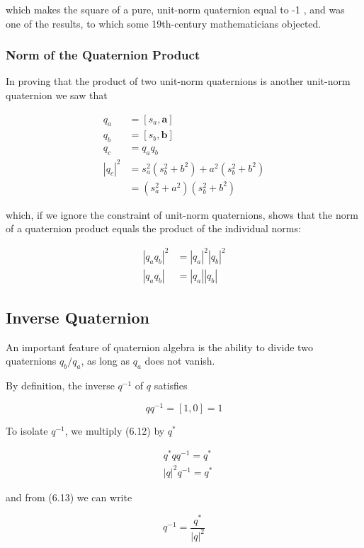 \documentclass[10pt]{article}
\begin{document}
which makes the square of a pure, unit-norm quaternion equal to -1 , and was one of the results, to which some 19th-century mathematicians objected.

\subsubsection{Norm of the Quaternion Product}
In proving that the product of two unit-norm quaternions is another unit-norm quaternion we saw that

$$
\begin{aligned}
q_{a} & =\left[s_{a}, \mathbf{a}\right] \\
q_{b} & =\left[s_{b}, \mathbf{b}\right] \\
q_{c} & =q_{a} q_{b} \\
\left|q_{c}\right|^{2} & =s_{a}^{2}\left(s_{b}^{2}+b^{2}\right)+a^{2}\left(s_{b}^{2}+b^{2}\right) \\
& =\left(s_{a}^{2}+a^{2}\right)\left(s_{b}^{2}+b^{2}\right)
\end{aligned}
$$

which, if we ignore the constraint of unit-norm quaternions, shows that the norm of a quaternion product equals the product of the individual norms:

$$
\begin{aligned}
\left|q_{a} q_{b}\right|^{2} & =\left|q_{a}\right|^{2}\left|q_{b}\right|^{2} \\
\left|q_{a} q_{b}\right| & =\left|q_{a}\right|\left|q_{b}\right|
\end{aligned}
$$

\subsection{Inverse Quaternion}
An important feature of quaternion algebra is the ability to divide two quaternions $q_{b} / q_{a}$, as long as $q_{a}$ does not vanish.

By definition, the inverse $q^{-1}$ of $q$ satisfies

$$
q q^{-1}=[1,0]=1
$$

To isolate $q^{-1}$, we multiply (6.12) by $q^{*}$

$$
\begin{aligned}
& q^{*} q q^{-1}=q^{*} \\
& |q|^{2} q^{-1}=q^{*}
\end{aligned}
$$

and from (6.13) we can write

$$
q^{-1}=\frac{q^{*}}{|q|^{2}}
$$
\end{document}
